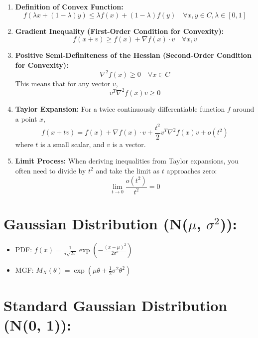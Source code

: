 \documentclass{article}
\begin{document}
\begin{enumerate}[1.]
    \item \textbf{Definition of Convex Function:}
    \[
    f(\lambda x + (1 - \lambda)y) \leq \lambda f(x) + (1 - \lambda)f(y) \quad \forall x, y \in C, \lambda \in [0, 1]
    \]
    
    \item \textbf{Gradient Inequality (First-Order Condition for Convexity):}
    \[
    f(x + v) \geq f(x) + \nabla f(x) \cdot v \quad \forall x, v
    \]
    
    \item \textbf{Positive Semi-Definiteness of the Hessian (Second-Order Condition for Convexity):}
    \[
    \nabla^2 f(x) \geq 0 \quad \forall x \in C
    \]
    This means that for any vector \( v \),
    \[
    v^T \nabla^2 f(x) v \geq 0
    \]
    
    \item \textbf{Taylor Expansion:}
    For a twice continuously differentiable function \( f \) around a point \( x \),
    \[
    f(x + tv) = f(x) + \nabla f(x) \cdot v + \frac{t^2}{2} v^T \nabla^2 f(x) v + o(t^2)
    \]
    where \( t \) is a small scalar, and \( v \) is a vector.
    
    \item \textbf{Limit Process:}
    When deriving inequalities from Taylor expansions, you often need to divide by \( t^2 \) and take the limit as \( t \) approaches zero:
    \[
    \lim_{t \to 0} \frac{o(t^2)}{t^2} = 0
    \]
\end{enumerate}













\section*{Gaussian Distribution (N($\mu$, $\sigma^2$)):}

\begin{itemize}
    \item PDF: $f(x) = \frac{1}{\sigma \sqrt{2\pi}} \exp\left(-\frac{(x - \mu)^2}{2\sigma^2}\right)$
    \item MGF: $M_X(\theta) = \exp\left(\mu \theta + \frac{1}{2} \sigma^2 \theta^2\right)$
\end{itemize}

\section*{Standard Gaussian Distribution (N(0, 1)):}
\end{document}
